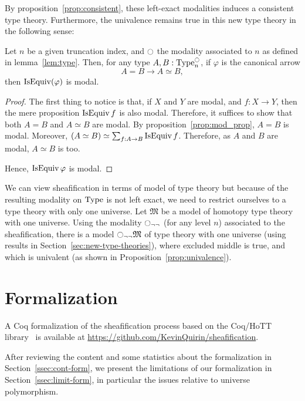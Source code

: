 By proposition~\ref{prop:consistent}, these left-exact modalities
induces a consistent type theory. Furthermore, the univalence remains
true in this new type theory in the following sense:
\begin{prop}\label{prop:univalence}
  Let $n$ be a given truncation index, and $\ocircle$ the modality
  associated to $n$ as defined in lemma~\ref{lem:type}. Then, for
  any type $A,B:\operatorname{Type}_n^{\ocircle}$, if $\varphi$ is the canonical arrow
  $$A = B \to A\simeq B,$$
  then $\operatorname{IsEquiv}(\varphi)$ is modal.
\end{prop}
\begin{proof}
  The first thing to notice is that, if $X$ and $Y$ are modal, and
  $f:X \to Y$, then the mere proposition $\operatorname{IsEquiv} f$ is also modal.
  Therefore, it suffices to show that both $A=B$ and $A\simeq B$ are
  modal. By proposition~\ref{prop:mod_prop}, $A=B$ is modal. 
  Moreover, $(A\simeq B) \simeq \sum_{f:A\to B} \operatorname{IsEquiv}
  f$. Therefore, as $A$ and $B$ are modal, $A\simeq B$ is too. 

  Hence, $\operatorname{IsEquiv} \varphi$ is modal.
\end{proof}

We can view sheafification in terms of model of type theory but
because of the resulting modality on $\operatorname{Type}$ is not left exact, we
need to restrict ourselves to a type theory with only one universe.
%
Let $\mathfrak M$ be a model of homotopy type theory with one
universe.
%
Using the modality $\ocircle_{\lnot \lnot}$ (for any level $n$) associated to the
sheafification, there is a model $\ocircle_{\lnot \lnot} \mathfrak M$ of type theory
with one universe (using results in
Section~\ref{sec:new-type-theories}), where excluded middle is true, and
which is univalent (as shown in Proposition~\ref{prop:univalence}).
%

\section{Formalization}
\label{sec:sheaf-formalization}

A Coq formalization of the sheafification process based on the
Coq/HoTT library~\cite{hottlib} is available at
\url{https://github.com/KevinQuirin/sheafification}.

After reviewing the content and some statistics about the
formalization in Section~\ref{ssec:cont-form}, we present the
limitations of our formalization in Section~\ref{ssec:limit-form}, in
particular the issues relative to universe polymorphism. 

